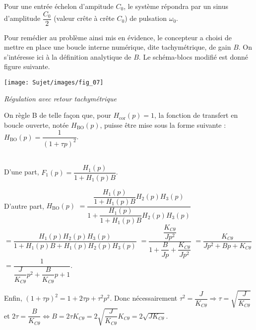 \begin{multicols}{2}
\begin{corrige}
Pour une entrée échelon d'ampitude $C_0$, le système répondra par un sinus d'amplitude $\dfrac{C_0}{2}$ (valeur crête à crête $C_0$) de pulsation $\omega_0$.
\end{corrige}
\else
\fi


\ifprof
\else
Pour remédier au problème ainsi mis en évidence, le concepteur a choisi de mettre en place une boucle
interne numérique, dite tachymétrique, de gain $B$. On s’intéresse ici à la définition analytique de $B$.
Le schéma-blocs modifié est donné figure suivante.


\begin{center}
\texttt{[image: Sujet/images/fig\_07]}

\footnotesize \textit{Régulation avec retour tachymétrique} \normalsize
\end{center}


On règle B de telle façon que, pour $H_{\text{cor}}(p)=1$, la fonction de transfert en boucle ouverte, notée $H_{\text{BO}}(p)$, puisse être mise sous la forme suivante : 
$H_{\text{BO}}(p)=\dfrac{1}{\left(1+\tau p\right)^2}$.

\fi

\ifprof
\begin{corrige}~\\

D'une part, $F_1(p)=\dfrac{H_1(p)}{1+H_1(p)B}$. 

D'autre part, 
$H_{\text{BO}}(p)$
$=\dfrac{\dfrac{H_1(p)}{1+H_1(p)B}H_2(p)H_3(p)}{1+\dfrac{H_1(p)}{1+H_1(p)B}H_2(p)H_3(p)}$ 
$=\dfrac{H_1(p)H_2(p)H_3(p)}{1+H_1(p)B+H_1(p)H_2(p)H_3(p)}$
$=\dfrac{\dfrac{K_{C\theta}}{Jp^2}}{1+\dfrac{B}{Jp}+\dfrac{K_{C\theta}}{Jp^2}}$
$=\dfrac{K_{C\theta}}{Jp^2+Bp+K_{C\theta}}$
$=\dfrac{1}{\dfrac{J}{K_{C\theta}}p^2+\dfrac{B}{K_{C\theta}}p+1}$.

Enfin, $\left(1+\tau p\right)^2 = 1+2\tau p + \tau^2p^2$. Donc nécessairement $\tau^2=\dfrac{J}{K_{C\theta}} \Rightarrow \tau=\sqrt{\dfrac{J}{K_{C\theta}}}$ et 
$2\tau = \dfrac{B}{K_{C\theta}} \Leftrightarrow B
=2\tau K_{C\theta}
=2\sqrt{\dfrac{J}{K_{C\theta}}} K_{C\theta}
=2\sqrt{JK_{C\theta}}$.
\end{corrige}
\else
\fi



\end{multicols}
